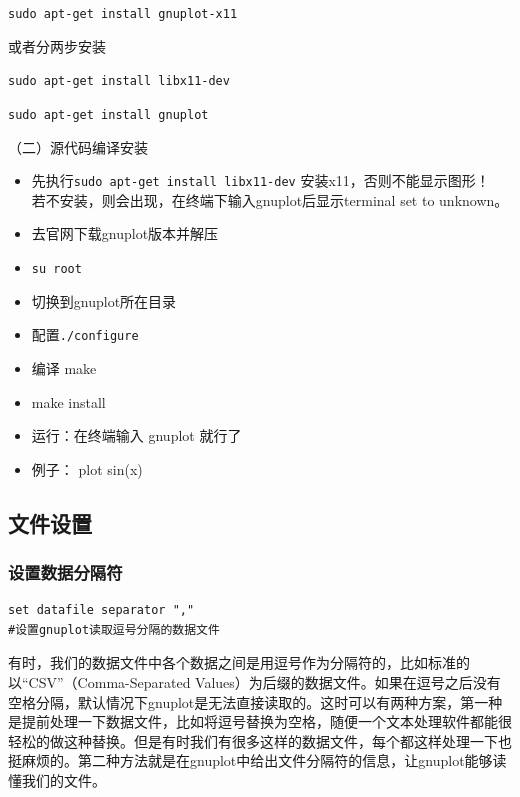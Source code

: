 \verb*|sudo apt-get install gnuplot-x11|

或者分两步安装

\verb*|sudo apt-get install libx11-dev|

\verb*|sudo apt-get install gnuplot|



（二）源代码编译安装
\begin{itemize}
\item 先执行\verb*|sudo apt-get install libx11-dev|  安装x11，否则不能显示图形！\\
若不安装，则会出现，在终端下输入gnuplot后显示terminal set to unknown。

\item 去官网下载gnuplot版本并解压

\item \verb*|su root|

\item 切换到gnuplot所在目录

\item 配置\verb*|./configure|

\item 编译 make

\item  make install

\item 运行：在终端输入 gnuplot 就行了

\item 例子： plot sin(x)
\end{itemize}



\subsection{文件设置}
\subsubsection{设置数据分隔符}
\begin{verbatim}
set datafile separator ","
#设置gnuplot读取逗号分隔的数据文件
\end{verbatim}

有时，我们的数据文件中各个数据之间是用逗号作为分隔符的，比如标准的以“CSV”（Comma-Separated Values）为后缀的数据文件。如果在逗号之后没有空格分隔，默认情况下gnuplot是无法直接读取的。这时可以有两种方案，第一种是提前处理一下数据文件，比如将逗号替换为空格，随便一个文本处理软件都能很轻松的做这种替换。但是有时我们有很多这样的数据文件，每个都这样处理一下也挺麻烦的。第二种方法就是在gnuplot中给出文件分隔符的信息，让gnuplot能够读懂我们的文件。

